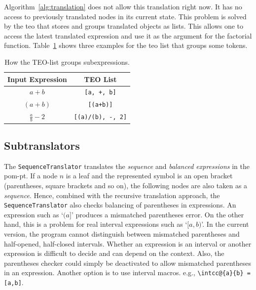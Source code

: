 \documentclass[a4paper,11pt]{article}
\theoremstyle{defTheoStyle}
\theoremstyle{defExampStyle}
\begin{document}
Algorithm~\ref{alg:translation} does not allow this translation right now. It has no access to previously translated nodes in its current state. This problem is solved by the \gls*{teo} that stores and groups translated objects as lists. This allows one to access the latest translated expression and use it as the argument for the factorial function. Table~\ref{tab:teo-list} shows three examples for the \gls*{teo} list that groups some tokens.

\begin{table}[ht]
\centering
\begin{tabular}{cc}
	\hline
	Input Expression & TEO List\\
	\hline
	$a+b$ & \verb|[a, +, b]|\\
	$(a+b)$ & \verb|[(a+b)]|\\
	$\frac{a}{b}-2$ & \verb|[(a)/(b), -, 2]|\\
	\hline
\end{tabular}
\caption{How the TEO-list groups subexpressions.}
\label{tab:teo-list}
\end{table}

\subsection{Subtranslators}\label{sec:subtranslators}
The \verb|SequenceTranslator| translates the \textit{sequence} and \textit{balanced expressions} in the \gls*{pom-pt}. If a node $n$ is a leaf and the represented symbol is an open bracket (parentheses, square brackets and so on), the following nodes are also taken as a \textit{sequence}. Hence, combined with the recursive translation approach, the 
\verb|SequenceTranslator| 
also checks balancing of parentheses in expressions. An expression such as `$(a]$' produces a mismatched parentheses error. On the other hand, this is a problem for real interval expressions such as `$[a,b)$'. In the current version, the program cannot distinguish between mismatched parentheses and half-opened, half-closed intervals. Whether an expression is an interval or another expression is difficult to decide and can depend on the context. Also, the parentheses checker could simply be deactivated to allow mismatched parentheses in an expression. Another option is to use interval macros. e.g., \verb|\intcc@{a}{b} = [a,b]|.
\end{document}
